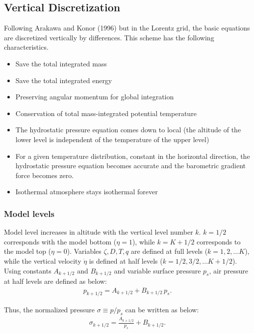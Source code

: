 \hypertarget{vertical-discretization}{%
\subsection{Vertical Discretization}\label{vertical-discretization}}

Following Arakawa and Konor (1996) but in the Lorentz grid, the basic
equations are discretized vertically by differences. This scheme has the
following characteristics.

\begin{itemize}
\item
  Save the total integrated mass
\item
  Save the total integrated energy
\item
  Preserving angular momentum for global integration
\item
  Conservation of total mass-integrated potential temperature
\item
  The hydrostatic pressure equation comes down to local (the altitude of
  the lower level is independent of the temperature of the upper level)
\item
  For a given temperature distribution, constant in the horizontal
  direction, the hydrostatic pressure equation becomes accurate and the
  barometric gradient force becomes zero.
\item
  Isothermal atmosphere stays isothermal forever
\end{itemize}

\hypertarget{model-levels}{%
\subsubsection{Model levels}\label{model-levels}}

Model level increases in altitude with the vertical level number $k$. $k=1/2$ corresponds with the model bottom (\(\eta=1\)), while $k=K+1/2$ corresponds to the model top ($\eta=0$).
Variables $\zeta,D,T,q$ are defined at full levels ($k=1,2,\ldots K$), while the vertical velocity $\dot{\eta}$ is defined at half levels ($k=1/2,3/2,\ldots K+1/2$).
Using constants $A_{k+1/2}$ and $B_{k+1/2}$ and variable surface pressure $p_s$, air pressure at half levels are defined as below:
\begin{eqnarray}
p_{k+1/2} = A_{k+1/2} +B_{k+1/2}\,p_s.
\end{eqnarray}

Thus, the normalized pressure \(\sigma\equiv p/p_s\) can be written as below:
\begin{eqnarray}
\sigma_{k+1/2} = \frac{A_{k+1/2}}{p_s} +B_{k+1/2}.
\end{eqnarray}

